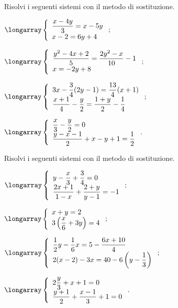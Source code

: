\begin{esercizio}[\Ast]
 \label{ese:21.11}
Risolvi i seguenti sistemi con il metodo di sostituzione.
 \begin{multicols}{2}
 \begin{enumeratea}
 \item $\longarray\left\{\begin{array}{l}\dfrac{x-4y}{3}=x-5y\\x-2=6y+4 \end{array}\right.;$
\item $\longarray\left\{\begin{array}{l}\dfrac{y^{2}-4x+2}{5}=\dfrac{2y^{2}-x}{10}-1\\x=-2y+8\end{array}\right.;$
\item $\longarray\left\{\begin{array}{l}3x-\dfrac{3}{4}(2y-1)=\dfrac{13}{4}(x+1)\\\dfrac{x+1}{4}-\dfrac{y}{2}=\dfrac{1+y}{2}-\dfrac{1}{4}\end{array}\right.;$
\item $\longarray\left\{\begin{array}{l}\dfrac{x}{3}-\dfrac{y}{2}=0\\\dfrac{y-x-1}{2}+x-y+1=\dfrac{1}{2}\end{array}\right..$
 \end{enumeratea}
 \end{multicols}
\end{esercizio}

\begin{esercizio}[\Ast]
 \label{ese:21.12}
Risolvi i seguenti sistemi con il metodo di sostituzione.
 \begin{multicols}{2}
 \begin{enumeratea}
  \item $\longarray\left\{\begin{array}{l}y-\dfrac{x}{3}+\dfrac{3}{4}=0\\\dfrac{2x+1}{1-x}+\dfrac{2+y}{y-1}=-1\end{array}\right.;$
\item $\longarray\left\{\begin{array}{l}x+y=2\\3\left(\dfrac{x}{6}+3y\right)=4\end{array}\right.;$
\item $\longarray\left\{\begin{array}{l}\dfrac{1}{2}y-\dfrac{1}{6}x=5-\dfrac{6x+10}{4}\\2(x-2)-3x=40-6\left(y-\dfrac{1}{3}\right)\end{array}\right.;$
\item $\longarray\left\{\begin{array}{l}2\dfrac{y}{3}+x+1=0\\\dfrac{y+1}{2}+\dfrac{x-1}{3}+1=0\end{array}\right..$
 \end{enumeratea}
 \end{multicols}
\end{esercizio}

